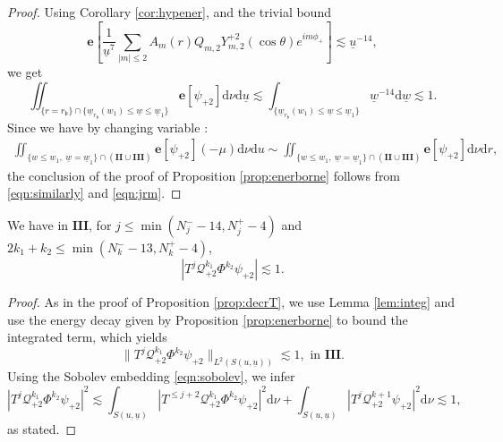 \documentclass[reqno]{amsart}
\numberwithin{equation}{section}
\newcommand{\mcq}{\mathcal{Q}}
\newcommand{\wbar}{\underline{w}}
\newcommand{\ubar}{{\underline{u}}}
\newcommand{\carterp}{\mcq_{+2}}
\newcommand{\dee}{\mathrm{d}}
\newcommand{\ener}{\mathbf{e}}
\newcommand{\deux}{\mathbf{II}}
\newcommand{\trois}{\mathbf{III}}
\newcommand{\rb}{r_\mathfrak{b}}
\newcommand{\psip}{\psi_{+2}}
\newcommand{\sfrak}{2}
\newcommand{\ansatzp}{\frac{1}{\ubar^{7}}\sum_{|m|\leq2}A_m(r)Q_{m,\sfrak}Y_{m,\sfrak}^{+\sfrak}(\cos\theta)e^{im\phi_{+}}}
\theoremstyle{plain}
\theoremstyle{definition}
\theoremstyle{remark}
\numberwithin{equation}{section}
\begin{document}
\begin{proof}
Using Corollary \ref{cor:hypener}, and the trivial bound
$$\ener\left[\ansatzp\right]\lesssim\ubar^{-14},$$
we get 
$$\iint_{\{r=\rb\}\cap\{\wbar_{\rb}(w_1)\leq\wbar\leq\wbar_1\}}\ener[\psip]\dee\nu\dee\ubar\lesssim \int_{\{\wbar_{\rb}(w_1)\leq\wbar\leq\wbar_1\}}\wbar^{-14}\dee\wbar\lesssim 1.$$
Since we have by changing variable :
\begin{align}\label{eqn:jrm}
    \iint_{\{w\leq w_1,\:\wbar=\wbar_1\}\cap(\deux\cup\trois)}{\ener}[\psip](-\mu)\dee\nu\dee u\sim\iint_{\{w\leq w_1,\:\wbar=\wbar_1\}\cap(\deux\cup\trois)}{\ener}[\psip]\dee\nu\dee r,
\end{align}
the conclusion of the proof of Proposition \ref{prop:enerborne} follows from \eqref{eqn:similarly} and \eqref{eqn:jrm}.
\end{proof}
\begin{prop}\label{prop:Linf}
We have in $\trois$, for $j\leq \min(N_j^--14,N_j^+-4)$ and $2k_1+k_2\leq \min(N_k^--13,N_k^+-4)$, 
$$|T^j\mcq_{+2}^{k_1}\Phi^{k_2}\psip|\lesssim 1.$$
\end{prop}
\begin{proof}
As in the proof of Proposition \ref{prop:decrT}, we use Lemma \ref{lem:integ} and use the energy decay given by Proposition \ref{prop:enerborne} to bound the integrated term, which yields
$$\|T^j\mcq_{+2}^{k_1}\Phi^{k_2}\psip\|_{L^2(S(u,\ubar))}\lesssim 1,\text{   in   }\trois.$$
Using the Sobolev embedding \eqref{eqn:sobolev}, we infer 
$$|T^j\carterp^{k_1}\Phi^{k_2}\psip|^2\lesssim \int_{S(u,\ubar)}|T^{\leq j+2}\carterp^{k_1}\Phi^{k_2}\psip|^2\dee\nu+\int_{S(u,\ubar)}|T^j\carterp^{k+1}\psip|^2\dee\nu\lesssim 1,$$
as stated.
\end{proof}
\end{document}
